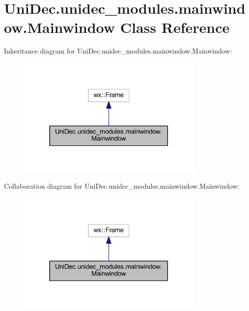 \hypertarget{class_uni_dec_1_1unidec__modules_1_1mainwindow_1_1_mainwindow}{}\section{Uni\+Dec.\+unidec\+\_\+modules.\+mainwindow.\+Mainwindow Class Reference}
\label{class_uni_dec_1_1unidec__modules_1_1mainwindow_1_1_mainwindow}


Inheritance diagram for Uni\+Dec.\+unidec\+\_\+modules.\+mainwindow.\+Mainwindow\+:\nopagebreak
\begin{figure}[H]
\begin{center}
\leavevmode
\includegraphics[width=260pt]{class_uni_dec_1_1unidec__modules_1_1mainwindow_1_1_mainwindow__inherit__graph}
\end{center}
\end{figure}


Collaboration diagram for Uni\+Dec.\+unidec\+\_\+modules.\+mainwindow.\+Mainwindow\+:\nopagebreak
\begin{figure}[H]
\begin{center}
\leavevmode
\includegraphics[width=260pt]{class_uni_dec_1_1unidec__modules_1_1mainwindow_1_1_mainwindow__coll__graph}
\end{center}
\end{figure}
